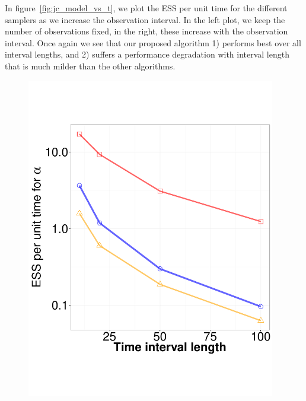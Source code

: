 {In figure~\ref{fig:jc_model_vs_t}, we plot the ESS per unit time for the
different samplers as we increase the observation interval. In the left plot,
we keep the number of observations fixed, in the right, these increase with
the observation interval. Once again we see that our proposed algorithm
1) performs best over all interval lengths, and 2) suffers a performance
degradation with interval length that is much milder than the other algorithms.
  \begin{figure}%
  \centering
  \begin{minipage}[!hp]{0.45\linewidth}
  \centering
    \includegraphics [width=0.97\textwidth, angle=0]{figs/ESS_vs_t_alpha_JC.pdf}
  \end{minipage}

\end{figure}}
